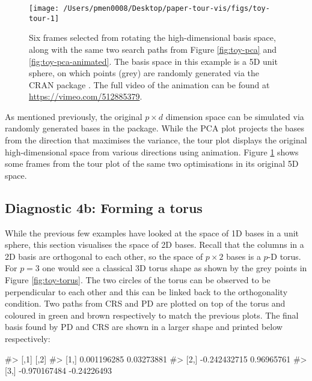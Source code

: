 \begin{Schunk}
\begin{figure}

{\centering \texttt{[image: /Users/pmen0008/Desktop/paper-tour-vis/figs/toy-tour-1]} 

}

\caption{Six frames selected from rotating the high-dimensional basis space, along with the same two search paths from Figure \ref{fig:toy-pca} and \ref{fig:toy-pca-animated}. The basis space in this example is a 5D unit sphere, on which points (grey) are randomly generated via the CRAN package . The full video of the animation can be found at \url{https://vimeo.com/512885379}.}\label{fig:toy-tour}
\end{figure}
\end{Schunk}

As mentioned previously, the original \(p \times d\) dimension space can
be simulated via randomly generated bases in the 
\citep{geozoo} package. While the PCA plot projects the bases from the
direction that maximises the variance, the tour plot displays the
original high-dimensional space from various directions using animation.
Figure \ref{fig:toy-tour} shows some frames from the tour plot of the
same two optimisations in its original 5D space.

\hypertarget{diagnostic-4b-forming-a-torus}{%
\subsection{Diagnostic 4b: Forming a
torus}\label{diagnostic-4b-forming-a-torus}}

While the previous few examples have looked at the space of 1D bases in
a unit sphere, this section visualises the space of 2D bases. Recall
that the columns in a 2D basis are orthogonal to each other, so the
space of \(p \times 2\) bases is a \(p\)-D torus. For \(p = 3\) one
would see a classical 3D torus shape as shown by the grey points in
Figure \ref{fig:toy-torus}. The two circles of the torus can be observed
to be perpendicular to each other and this can be linked back to the
orthogonality condition. Two paths from CRS and PD are plotted on top of
the torus and coloured in green and brown respectively to match the
previous plots. The final basis found by PD and CRS are shown in a
larger shape and printed below respectively:

\begin{Schunk}
\begin{Soutput}
#>              [,1]        [,2]
#> [1,]  0.001196285  0.03273881
#> [2,] -0.242432715  0.96965761
#> [3,] -0.970167484 -0.24226493
\end{Soutput}
\end{Schunk}

